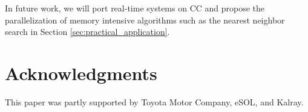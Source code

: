 \documentclass[conference,compsoc]{IEEEtran}
\newcommand{\comment}[1]{}
\begin{document}
In future work, we will port real-time systems on CC and propose the parallelization of memory intensive algorithms such as the nearest neighbor search in Section \ref{sec:practical_application}.

\vspace{-3mm}
\section*{Acknowledgments}
\vspace{-3mm}
This paper was partly supported by Toyota Motor Company, eSOL, and Kalray.

% 
% 

\renewcommand{\baselinestretch}{0.8}

\comment{2-5}
\comment{TBD: 3-6}
\vspace{-1mm}

\end{document}
